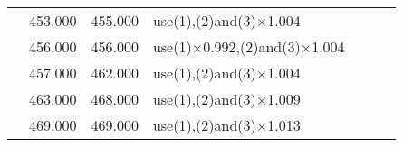\begin{table}[!h]
\begin{tabular}{ | c | c | c | p{5.5cm} | c | c | c |}
    &   453.000 &   455.000 &   use(1),(2)and(3)$\times$1.004  &       &       &       \\
    &   456.000 &   456.000 &   use(1)$\times$0.992,(2)and(3)$\times$1.004    &       &       &       \\
    &   457.000 &   462.000 &   use(1),(2)and(3)$\times$1.004  &       &       &       \\
    &   463.000 &   468.000 &   use(1),(2)and(3)$\times$1.009  &       &       &       \\
    &   469.000 &   469.000 &   use(1),(2)and(3)$\times$1.013  &       &       &       \\
    \hline
    \end{tabular}
\end{table}


